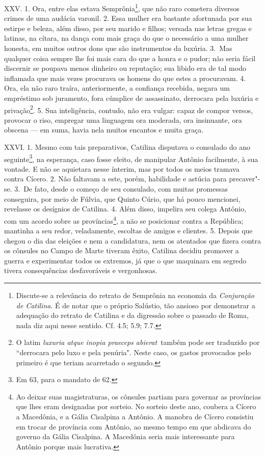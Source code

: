 XXV. 1. Ora, entre elas estava Semprônia\footnote{Discute-se a relevância do
retrato de Semprônia na economia da \emph{Conjuração de Catilina}. É de notar
que o próprio Salústio, tão ansioso por demonstrar a adequação do retrato de
Catilina e da digressão sobre o passado de Roma, nada diz aqui nesse sentido.
Cf. 4.5; 5.9; 7.7.}, que não raro cometera diversos crimes de uma audácia
varonil. 2. Essa mulher era bastante afortunada por sua estirpe e beleza, além
disso, por seu marido e filhos; versada nas letras gregas e latinas, na cítara,
na dança com mais graça do que o necessário a uma mulher honesta, em muitos
outros dons que são instrumentos da luxúria. 3.~Mas qualquer coisa sempre lhe
foi mais cara do que a honra e o pudor; não seria fácil discernir se poupava
menos dinheiro ou reputação; sua libido era de tal modo inflamada que mais
vezes procurava os homens do que estes a procuravam. 4. Ora, ela não raro
traíra, anteriormente, a confiança recebida, negara um empréstimo sob
juramento, fora cúmplice de assassinato, derrocara pela luxúria e privação\footnote{O latim \emph{luxuria atque inopia praeceps abierat}\ também pode ser traduzido por ``derrocara pelo luxo e pela penúria". Neste caso, os gastos provocados pelo primeiro é que teriam acarretado o segundo.}. 5. 
Sua inteligência, contudo, não era vulgar: capaz de compor versos, provocar o
riso, empregar uma linguagem ora moderada, ora insinuante, ora obscena --- em
suma, havia nela muitos encantos e muita graça.

XXVI. 1. Mesmo com tais preparativos, Catilina disputava o consulado do ano
seguinte\footnote{Em 63, para o mandato de 62.}, na esperança, caso fosse
eleito, de manipular Antônio facilmente, à sua vontade. E não se aquietara
nesse ínterim, mas por todos os meios tramava contra Cícero. 2. Não faltavam a
este, porém, habilidade e astúcia para precaver"-se. 3.~De fato, desde o começo
de seu consulado, com muitas promessas conseguira, por meio de Fúlvia, que
Quinto Cúrio, que há pouco mencionei, revelasse os desígnios de Catilina. 4.
Além disso, impelira seu colega Antônio, com um acordo sobre as
províncias\footnote{Ao deixar suas magistraturas, os cônsules partiam para
governar as províncias que lhes eram designadas por sorteio. No sorteio deste
ano, coubera a Cícero a Macedônia, e a Gália Cisalpina a Antônio. A manobra de Cícero
consistiu em trocar de província com Antônio, ao mesmo tempo em que abdicava do
governo da Gália Cisalpina. A Macedônia seria mais interessante para Antônio porque mais
lucrativa.}, a não se posicionar contra a República; mantinha a seu redor,
veladamente, escoltas de amigos e clientes. 5. Depois que chegou o dia das
eleições e nem a candidatura, nem os atentados que fizera contra os cônsules no
Campo de Marte tiveram êxito, Catilina decidiu promover a guerra e experimentar
todos os extremos, já que o que maquinara em segredo tivera consequências
desfavoráveis e vergonhosas.

